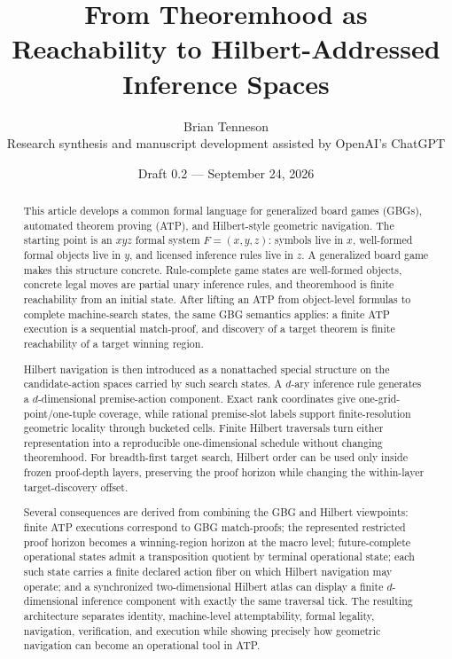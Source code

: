 \documentclass[11pt]{article}
\title{\textbf{From Theoremhood as Reachability to Hilbert-Addressed Inference Spaces}}
\author{Brian Tenneson\\[3pt]\small Research synthesis and manuscript development assisted by OpenAI's ChatGPT}
\date{Draft 0.2 --- September 24, 2026}
\theoremstyle{definition}
\begin{document}
\maketitle

\begin{abstract}
This article develops a common formal language for generalized board games (GBGs), automated theorem proving (ATP), and Hilbert-style geometric navigation. The starting point is an $xyz$ formal system $F=(x,y,z)$: symbols live in $x$, well-formed formal objects live in $y$, and licensed inference rules live in $z$. A generalized board game makes this structure concrete. Rule-complete game states are well-formed objects, concrete legal moves are partial unary inference rules, and theoremhood is finite reachability from an initial state. After lifting an ATP from object-level formulas to complete machine-search states, the same GBG semantics applies: a finite ATP execution is a sequential match-proof, and discovery of a target theorem is finite reachability of a target winning region.

Hilbert navigation is then introduced as a nonattached special structure on the candidate-action spaces carried by such search states. A $d$-ary inference rule generates a $d$-dimensional premise-action component. Exact rank coordinates give one-grid-point/one-tuple coverage, while rational premise-slot labels support finite-resolution geometric locality through bucketed cells. Finite Hilbert traversals turn either representation into a reproducible one-dimensional schedule without changing theoremhood. For breadth-first target search, Hilbert order can be used only inside frozen proof-depth layers, preserving the proof horizon while changing the within-layer target-discovery offset.

Several consequences are derived from combining the GBG and Hilbert viewpoints: finite ATP executions correspond to GBG match-proofs; the represented restricted proof horizon becomes a winning-region horizon at the macro level; future-complete operational states admit a transposition quotient by terminal operational state; each such state carries a finite declared action fiber on which Hilbert navigation may operate; and a synchronized two-dimensional Hilbert atlas can display a finite $d$-dimensional inference component with exactly the same traversal tick. The resulting architecture separates identity, machine-level attemptability, formal legality, navigation, verification, and execution while showing precisely how geometric navigation can become an operational tool in ATP.
\end{abstract}
\end{document}
